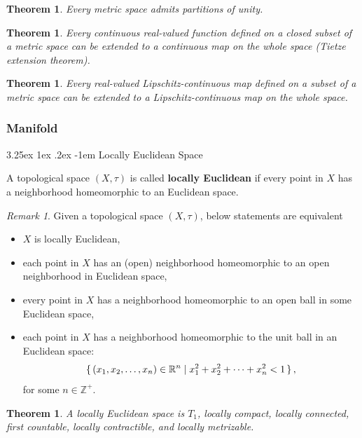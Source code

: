 \documentclass[12pt, letterpaper]{article}
\makeatletter
\newcommand{\inte}{\mathbb{Z}}
\newcommand{\re}{\mathbb{R}}
\newtheorem{thm}[prop]{Theorem}
\renewcommand\paragraph{\@startsection{paragraph}{4}{\z@}%
	{3.25ex \@plus1ex \@minus.2ex}%
	{-1em}%
	{\normalfont\normalsize\bfseries}}
\theoremstyle{definition}
\theoremstyle{remark}
\newtheorem*{rem*}{Remark}
\theoremstyle{definition}
\theoremstyle{plain}
\numberwithin{equation}{section}
\makeatother
\begin{document}
	\begin{thm}
		Every metric space admits partitions of unity.
	\end{thm}

	\begin{thm}
		Every continuous real-valued function defined on a closed subset of a metric space can be extended to a continuous map on the whole space (Tietze extension theorem).
	\end{thm}

	\begin{thm}
		Every real-valued Lipschitz-continuous map defined on a subset of a metric space can be extended to a Lipschitz-continuous map on the whole space.
	\end{thm}
	
	\subsubsection{Manifold}
	\paragraph{Locally Euclidean Space}
	\begin{def*}
		A topological space $(X,\tau)$ is called \textbf{locally Euclidean}
		if every point in $X$ has a neighborhood homeomorphic to an Euclidean space.
	\end{def*}
	\begin{rem*}
		Given a topological space $(X,\tau)$, below statements are equivalent
		\begin{itemize}
			\item $X$ is locally Euclidean,
			\item each point in $X$ has an (open) neighborhood homeomorphic to an open neighborhood in Euclidean space,
			\item every point in $X$ has a neighborhood homeomorphic to an open ball in some Euclidean space,
			\item each point in $X$ has a neighborhood homeomorphic to the unit ball in an Euclidean space:
			\[ \set{(x_{1},x_{2},\dots ,x_{n})\in \mathbb {R} ^{n}\mid x_{1}^{2}+x_{2}^{2}+\cdots +x_{n}^{2}<1} ,\]
			for some $n\in\inte^+$.
		\end{itemize}		
	\end{rem*}

	\begin{thm}
		A locally Euclidean space is $T_1$,
		locally compact, locally connected, first countable, locally contractible, and locally metrizable.
	\end{thm}
	
\end{document}
